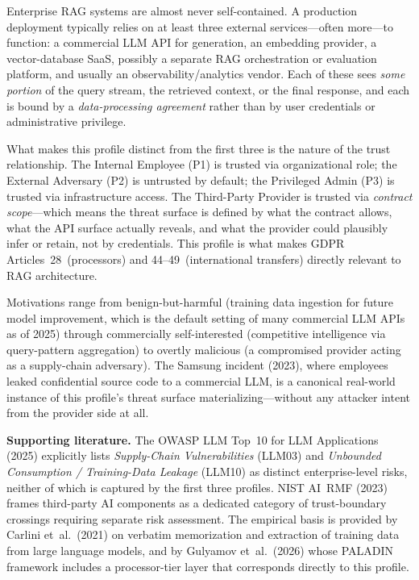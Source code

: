 \documentclass[11pt,a4paper]{report}
\begin{document}
\begin{prosebox}
Enterprise RAG systems are almost never self-contained. A production
deployment typically relies on at least three external services---often
more---to function: a commercial LLM API for generation, an embedding
provider, a vector-database SaaS, possibly a separate RAG orchestration
or evaluation platform, and usually an observability/analytics vendor. Each
of these sees \emph{some portion} of the query stream, the retrieved
context, or the final response, and each is bound by a
\emph{data-processing agreement} rather than by user credentials or
administrative privilege.

What makes this profile distinct from the first three is the nature of
the trust relationship. The Internal Employee (P1) is trusted via
organizational role; the External Adversary (P2) is untrusted by default;
the Privileged Admin (P3) is trusted via infrastructure access. The
Third-Party Provider is trusted via \emph{contract scope}---which means
the threat surface is defined by what the contract allows, what the API
surface actually reveals, and what the provider could plausibly infer or
retain, not by credentials. This profile is what makes GDPR
Articles~28~(processors) and 44--49~(international transfers) directly
relevant to RAG architecture.

Motivations range from benign-but-harmful (training data ingestion for
future model improvement, which is the default setting of many commercial
LLM APIs as of 2025) through commercially self-interested (competitive
intelligence via query-pattern aggregation) to overtly malicious
(a compromised provider acting as a supply-chain adversary). The Samsung
incident (2023), where employees leaked confidential source code to a
commercial LLM, is a canonical real-world instance of this profile's
threat surface materializing---without any attacker intent from the
provider side at all.

\medskip
\textbf{Supporting literature.}
The OWASP LLM Top~10 for LLM Applications (2025) explicitly lists
\emph{Supply-Chain Vulnerabilities} (LLM03) and \emph{Unbounded Consumption /
Training-Data Leakage} (LLM10) as distinct enterprise-level risks,
neither of which is captured by the first three profiles.
NIST AI~RMF (2023) frames third-party AI components as a dedicated
category of trust-boundary crossings requiring separate risk assessment.
The empirical basis is provided by Carlini et~al.\ (2021) on verbatim
memorization and extraction of training data from large language models, and by
Gulyamov et~al.\ (2026) whose PALADIN framework includes a processor-tier
layer that corresponds directly to this profile.
\end{prosebox}
\end{document}
